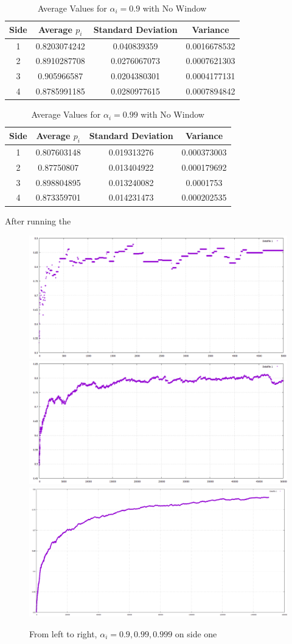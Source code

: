 \documentclass{article}
\begin{document}
\begin{table}[h!]
\centering
\caption{Average Values for $\alpha_i = 0.9$ with No Window}
\label{tab:table1}
\begin{tabular}{|c|c|c|c|}
\hline
Side & Average $p_i$ & Standard Deviation & Variance\\
\hline
1 & 0.8203074242 & 0.040839359 & 0.0016678532\\
2 & 0.8910287708 & 0.0276067073 & 0.0007621303\\
3 & 0.905966587 & 0.0204380301 & 0.0004177131\\
4 & 0.8785991185 & 0.0280977615 & 0.0007894842\\
\hline
\end{tabular}
\end{table}

\begin{table}[h!]
\centering
\caption{Average Values for $\alpha_i = 0.99$ with No Window}
\label{tab:table1}
\begin{tabular}{|c|c|c|c|}
\hline
Side & Average $p_i$ & Standard Deviation & Variance\\
\hline
1 & 0.807603148 & 0.019313276 & 0.000373003\\
2 & 0.87750807 & 0.013404922 & 0.000179692\\
3 & 0.898804895 & 0.013240082 & 0.0001753\\
4 & 0.873359701 & 0.014231473 & 0.000202535\\
\hline
\end{tabular}
\end{table}

After running the

\begin{figure}[htp]
\centering
\includegraphics[width=.3\textwidth]{images/ai9side1}\hfill
\includegraphics[width=.3\textwidth]{images/ai99side1}\hfill
\includegraphics[width=.3\textwidth]{images/ai999side1}
\caption{From left to right, $\alpha_i = 0.9, 0.99, 0.999$ on side one}
\label{fig:figure3}
\end{figure}
\end{document}
